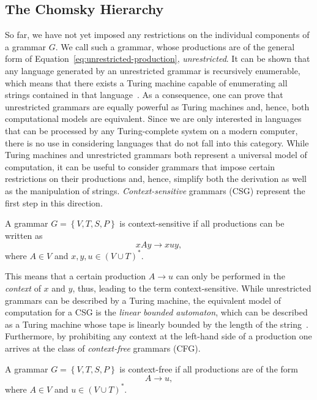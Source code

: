 \subsection{The Chomsky Hierarchy}
\label{sec:chomsky-hierarchy}
So far, we have not yet imposed any restrictions on the individual components of a grammar $G$.
We call such a grammar, whose productions are of the general form of Equation~\eqref{eq:unrestricted-production}, \emph{unrestricted}.
It can be shown that any language generated by an unrestricted grammar is recursively enumerable, which means that there exists a Turing machine capable of enumerating all strings contained in that language~\cite{linz2006introduction}.
As a consequence, one can prove that unrestricted grammars are equally powerful as Turing machines and, hence, both computational models are equivalent.
Since we are only interested in languages that can be processed by any Turing-complete system on a modern computer, there is no use in considering languages that do not fall into this category.
While Turing machines and unrestricted grammars both represent a universal model of computation, it can be useful to consider grammars that impose certain restrictions on their productions and, hence, simplify both the derivation as well as the manipulation of strings.
\emph{Context-sensitive} grammars (CSG) represent the first step in this direction.
\begin{definition}
A grammar $G = \left\{V, T, S, P\right\}$ is context-sensitive if all productions can be written as
\begin{equation*}
	xAy \to xuy,
\end{equation*}
where $A \in V$ and $x, y, u \in \left(V \cup T\right)^*$.
\label{def:context-sensitive-grammar}
\end{definition}
This means that a certain production $A \to u$ can only be performed in the \emph{context} of $x$ and $y$, thus, leading to the term context-sensitive.
While unrestricted grammars can be described by a Turing machine, the equivalent model of computation for a CSG is the \emph{linear bounded automaton}, which can be described as a Turing machine whose tape is linearly bounded by the length of the string~\cite{linz2006introduction}.
Furthermore, by prohibiting any context at the left-hand side of a production one arrives at the class of \emph{context-free} grammars (CFG).
\begin{definition}
	A grammar $G = \left\{V, T, S, P\right\}$ is context-free if all productions are of the form
	\begin{equation*}
		A \to u,
	\end{equation*}
	where $A \in V$ and $u \in \left(V \cup T\right)^*$.
\end{definition}
